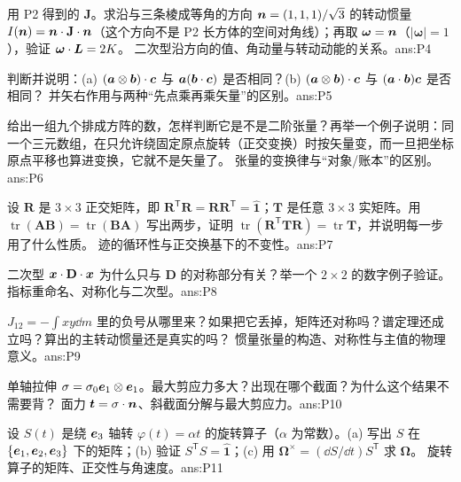\documentclass[11pt]{ctexart}
\newcommand{\ten}[1]{\mathbf{#1}}
\newcommand{\unitd}{\hat{\ten{1}}}
\newcommand{\tr}{\operatorname{tr}}
\begin{document}
{用 P2 得到的 $\ten J$。求沿与三条棱成等角的方向 $\boldsymbol{n}=(1,1,1)/\sqrt3$ 的转动惯量 $I(\vect n)=\vect n\cdot\ten J\cdot\vect n$（这个方向不是 P2 长方体的空间对角线）；再取 $\boldsymbol\omega=\boldsymbol{n}$（$|\boldsymbol\omega|=1$），验证 $\boldsymbol\omega\cdot\boldsymbol{L}=2K$。}
{二次型沿方向的值、角动量与转动动能的关系。}{ans:P4}

{判断并说明：(a) $(\boldsymbol{a}\otimes\boldsymbol{b})\cdot\boldsymbol{c}$ 与 $\boldsymbol{a}(\boldsymbol{b}\cdot\boldsymbol{c})$ 是否相同？(b) $(\boldsymbol{a}\otimes\boldsymbol{b})\cdot\boldsymbol{c}$ 与 $(\boldsymbol{a}\cdot\boldsymbol{b})\boldsymbol{c}$ 是否相同？}
{并矢右作用与两种“先点乘再乘矢量”的区别。}{ans:P5}

{给出一组九个排成方阵的数，怎样判断它是不是二阶张量？再举一个例子说明：同一个三元数组，在只允许绕固定原点旋转（正交变换）时按矢量变，而一旦把坐标原点平移也算进变换，它就不是矢量了。}
{张量的变换律与“对象/账本”的区别。}{ans:P6}

{设 $\ten R$ 是 $3\times3$ 正交矩阵，即 $\ten R^{\mathsf T}\ten R=\ten R\ten R^{\mathsf T}=\unitd$；$\ten T$ 是任意 $3\times3$ 实矩阵。用 $\tr(\ten A\ten B)=\tr(\ten B\ten A)$ 写出两步，证明 $\tr(\ten R^{\mathsf T}\ten T\ten R)=\tr\ten T$，并说明每一步用了什么性质。}
{迹的循环性与正交换基下的不变性。}{ans:P7}

{二次型 $\vect x\cdot\ten D\cdot\vect x$ 为什么只与 $\ten D$ 的对称部分有关？举一个 $2\times2$ 的数字例子验证。}
{指标重命名、对称化与二次型。}{ans:P8}

{$J_{12}=-\int xy\dd m$ 里的负号从哪里来？如果把它丢掉，矩阵还对称吗？谱定理还成立吗？算出的主转动惯量还是真实的吗？}
{惯量张量的构造、对称性与主值的物理意义。}{ans:P9}

{单轴拉伸 $\ten\sigma=\sigma_0\vect e_1\otimes\vect e_1$。最大剪应力多大？出现在哪个截面？为什么这个结果不需要背？}
{面力 $\vect t=\ten\sigma\cdot\vect n$、斜截面分解与最大剪应力。}{ans:P10}

{设 $S(t)$ 是绕 $\boldsymbol{e}_3$ 轴转 $\varphi(t)=\alpha t$ 的旋转算子（$\alpha$ 为常数）。(a) 写出 $S$ 在 $\{\boldsymbol{e}_1,\boldsymbol{e}_2,\boldsymbol{e}_3\}$ 下的矩阵；(b) 验证 $S^{\mathsf T}S=\unitd$；(c) 用 $\boldsymbol\Omega^{\times}=(\dd S/\dd t)S^{\mathsf T}$ 求 $\boldsymbol\Omega$。}
{旋转算子的矩阵、正交性与角速度。}{ans:P11}
\end{document}
